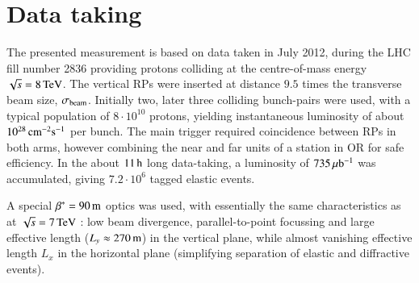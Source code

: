 \section{Data taking}

The presented measurement is based on data taken in July 2012, during the LHC fill number 2836 providing protons colliding at the centre-of-mass energy $\sqrt s = 8\,{\rm TeV}$. The vertical RPs were inserted at distance $9.5$ times the transverse beam size, $\sigma_{\rm beam}$. Initially two, later three colliding bunch-pairs were used, with a typical population of $8\cdot10^{10}$ protons, yielding instantaneous luminosity of about $10^{28}\,{\rm cm^{-2}s^{-1}}$ per bunch. The main trigger required coincidence between RPs in both arms, however combining the near and far units of a station in OR for safe efficiency. In the about $11\,{\rm h}$ long data-taking, a luminosity of $735\,{\rm \mu b^{-1}}$ was accumulated, giving $7.2\cdot 10^6$ tagged elastic events.

A special $\beta^* = 90\,{\rm m}$ optics was used, with essentially the same characteristics as at $\sqrt s = 7\,{\rm TeV}$ \cite{epl96}: low beam divergence, parallel-to-point focussing and large effective length ($L_y \approx 270\,{\rm m}$) in the vertical plane, while almost vanishing effective length $L_x$ in the horizontal plane (simplifying separation of elastic and diffractive events).

